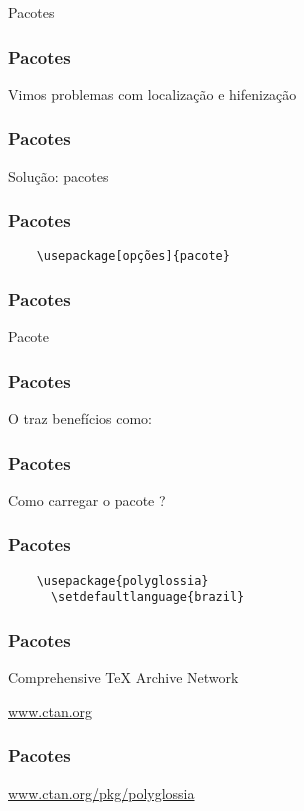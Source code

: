 \begin{frame}[standout]
  \Huge
  Pacotes
\end{frame}

\begin{frame}
  \frametitle{Pacotes}
  \huge
  Vimos problemas com localização e hifenização
\end{frame}

\begin{frame}
  \frametitle{Pacotes}
  \Huge
  Solução: pacotes
\end{frame}

\begin{frame}[fragile]
  \frametitle{Pacotes}
  \begin{verbatim}
    \usepackage[opções]{pacote}
  \end{verbatim}
\end{frame}

\begin{frame}
  \frametitle{Pacotes}
  \Huge
  Pacote 
\end{frame}

\begin{frame}
  \frametitle{Pacotes}
  \Huge
  O  traz benefícios como:
  \begin{itemize}
  \end{itemize}
\end{frame}

\begin{frame}
  \frametitle{Pacotes}
  \Huge
  Como carregar o pacote ?
\end{frame}

\begin{frame}[fragile]
  \frametitle{Pacotes}
  \begin{verbatim}
    \usepackage{polyglossia}
      \setdefaultlanguage{brazil}
  \end{verbatim}
\end{frame}

\begin{frame}
  \frametitle{Pacotes}
  \Huge
  Comprehensive \TeX{} Archive Network

  \url{www.ctan.org}
\end{frame}

\begin{frame}
  \frametitle{Pacotes}
  \huge
  \url{www.ctan.org/pkg/polyglossia}
\end{frame}
